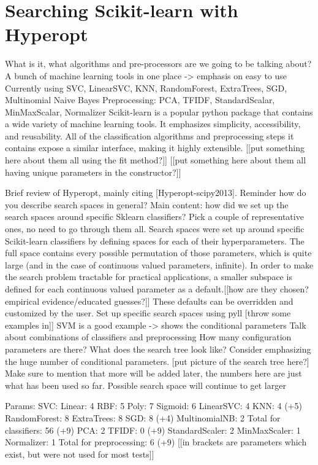 \documentclass[wcp]{jmlr}
\begin{document}
\section{Searching Scikit-learn with Hyperopt}

What is it, what algorithms and pre-processors are we going to be talking about?
A bunch of machine learning tools in one place -> emphasis on easy to use
Currently using SVC, LinearSVC, KNN, RandomForest, ExtraTrees, SGD, Multinomial Naive Bayes
Preprocessing: PCA, TFIDF, StandardScalar, MinMaxScalar, Normalizer
Scikit-learn is a popular python package that contains a wide variety of machine learning tools. It emphasizes simplicity, accessibility, and reusability. All of the classification algorithms and preprocessing steps it contains expose a similar interface, making it highly extensible. 
[[put something here about them all using the fit method?]]
[[put something here about them all having unique parameters in the constructor?]]

Brief review of Hyperopt, mainly citing [Hyperopt-scipy2013]. Reminder how do you describe search spaces in general?
Main content: how did we set up the search spaces around specific Sklearn classifiers? Pick a couple of representative ones, no need to go through them all.
Search spaces were set up around specific Scikit-learn classifiers by defining spaces for each of their hyperparameters. The full space contains every possible permutation of those parameters, which is quite large (and in the case of continuous valued parameters, infinite). In order to make the search problem tractable for practical applications, a smaller subspace is defined for each continuous valued parameter as a default.[[how are they chosen? empirical evidence/educated guesses?]] These defaults can be overridden and customized by the user. 
Set up specific search spaces using pyll [throw some examples in]]
SVM is a good example -> shows the conditional parameters
Talk about combinations of classifiers and preprocessing
How many configuration parameters are there? What does the search tree look like? Consider emphasizing the huge number of conditional parameters.
[put picture of the search tree here?]
Make sure to mention that more will be added later, the numbers here are just what has been used so far. Possible search space will continue to get larger

Params:
SVC:
Linear: 4
RBF: 5
Poly: 7
Sigmoid: 6
LinearSVC: 4
KNN: 4 (+5)
RandomForest: 8
ExtraTrees: 8
SGD: 8 (+4)
MultinomialNB: 2
Total for classifiers: 56 (+9)
PCA: 2
TFIDF: 0 (+9)
StandardScaler: 2
MinMaxScaler: 1
Normalizer: 1
Total for preprocessing: 6 (+9)
[[in brackets are parameters which exist, but were not used for most tests]]
\end{document}
